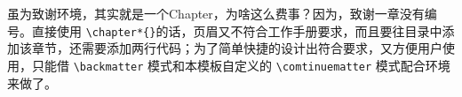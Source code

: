\begin{thanksfor}
虽为致谢环境，其实就是一个Chapter，为啥这么费事？因为，致谢一章没有编号。直接使用 \verb=\chapter*{}=的话，页眉又不符合工作手册要求，而且要往目录中添加该章节，还需要添加两行代码；为了简单快捷的设计出符合要求，又方便用户使用，只能借 \verb=\backmatter= 模式和本模板自定义的 \verb=\comtinuematter= 模式配合环境来做了。
\end{thanksfor}